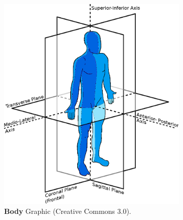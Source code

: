 \begin{figure}
\begin{subfigure}{0.60\linewidth}
	\centering
	\includegraphics[width=\linewidth]{./intro/Figures/Anatomical-Planes-en}
	\caption{\textbf{Body} Graphic \citet{edoarado_anatomical_2011} (Creative Commons 3.0).}
	\label{fig:Planes_body}
\end{subfigure}
\begin{subfigure}{0.36725\linewidth}
	\centering

\end{subfigure}
\end{figure}
